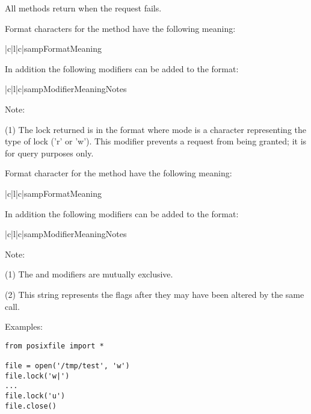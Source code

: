 All methods return  when the request fails.

Format characters for the  method have the following meaning:

\begin{tableiii}{|c|l|c|}{samp}{Format}{Meaning}{}
\end{tableiii}

In addition the following modifiers can be added to the format:

\begin{tableiii}{|c|l|c|}{samp}{Modifier}{Meaning}{Notes}
\end{tableiii}

Note:

(1) The lock returned is in the format  where mode is a character representing the type of lock
('r' or 'w').  This modifier prevents a request from being granted; it
is for query purposes only.

Format character for the  method have the following meaning:

\begin{tableiii}{|c|l|c|}{samp}{Format}{Meaning}{}
\end{tableiii}

In addition the following modifiers can be added to the format:

\begin{tableiii}{|c|l|c|}{samp}{Modifier}{Meaning}{Notes}
\end{tableiii}

Note:

(1) The \code{!} and \code{=} modifiers are mutually exclusive.

(2) This string represents the flags after they may have been altered
by the same call.

Examples:

\bcode\begin{verbatim}
from posixfile import *

file = open('/tmp/test', 'w')
file.lock('w|')
...
file.lock('u')
file.close()
\end{verbatim}\ecode
